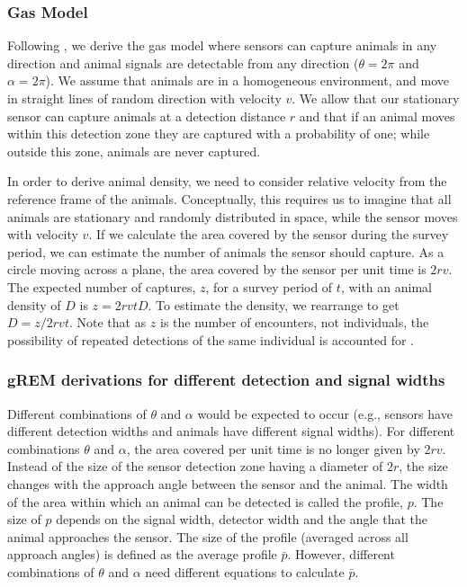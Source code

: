 \documentclass[a4paper,10pt,reqno,oneside]{amsart}
\begin{document}
\subsubsection*{Gas Model}

Following \cite{yapp1956theory}, we derive the gas model where sensors can capture animals in any direction and animal signals are detectable from any direction ($ \theta =  2\pi$ and $ \alpha =  2\pi$). We assume that animals are in a homogeneous environment, and move in straight lines of random direction with velocity $v$. We allow that our stationary sensor can capture animals at a detection distance $r$ and that if an animal moves within this detection zone they are captured with a probability of one; while outside this zone, animals are never captured.

In order to derive animal density, we need to consider relative velocity from the reference frame of the animals. Conceptually, this requires us to imagine that all animals are stationary and randomly distributed in space, while the sensor moves with velocity $v$. If we calculate the area covered by the sensor during the survey period, we can estimate the number of animals the sensor should capture. As a circle moving across a plane, the area covered by the sensor per unit time is $2rv$. The expected number of captures, $z$, for a survey period of $t$, with an animal density of $D$ is $z = 2rvtD$. To estimate the density, we rearrange to get $D = z/2rvt$. Note that as $z$ is the number of encounters, not individuals, the possibility of repeated detections of the same individual is accounted for \citep{Hutchinson_Waser_2007}.

\subsubsection*{gREM derivations for different detection and signal widths}
Different combinations of $\theta$ and $\alpha$ would be expected to occur (e.g., sensors have different detection widths and animals have different signal widths). For different combinations $\theta$ and $\alpha$, the area covered per unit time is no longer given by $2rv$. Instead of the size of the sensor detection zone having a diameter of $2r$, the size changes with the approach angle between the sensor and the animal. The width of the area within which an animal can be detected is called the profile, $p$. The size of $p$ depends on the signal width, detector width and the angle that the animal approaches the sensor. The size of the profile (averaged across all approach angles) is defined as the average profile $\bar{p}$. However, different combinations of $\theta$ and $\alpha$ need different equations to calculate $\bar{p}$. 
\end{document}
